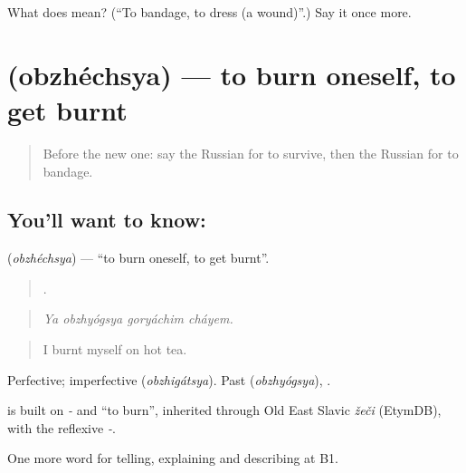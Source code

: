 \begin{tcolorbox}[breakable,colback=teal!4,colframe=teal!35!black,title={Before you move on}]
What does  mean? (\textquotedblleft{}To bandage, to dress (a wound)\textquotedblright{}.) Say it once more.
\end{tcolorbox}
\section[\texorpdfstring{\ru{обжечься} (obzhéchsya)}{обжечься (obzhéchsya)}]{ (obzhéchsya) — to burn oneself, to get burnt}

\label{lesson:RU-C302-obzhechsya}



\begin{quote}
Before the new one: say the Russian for to survive, then the Russian for to bandage.
\end{quote}

\subsection*{You'll want to know: }
\textbf{} (\emph{obzhéchsya}) — \textquotedblleft{}to burn oneself, to get burnt\textquotedblright{}.

\begin{quote}
   .
\end{quote}

\begin{quote}
\emph{Ya obzhyógsya goryáchim cháyem.}
\end{quote}

\begin{quote}
I burnt myself on hot tea.
\end{quote}

Perfective; imperfective \emph{} (\emph{obzhigátsya}). Past \emph{} (\emph{obzhyógsya}), \emph{}.

\begin{cousinweb}
\emph{} is built on \emph{-} and \emph{} \textquotedblleft{}to burn\textquotedblright{}, inherited through Old East Slavic \emph{žeči} (EtymDB), with the reflexive \emph{-}.
\end{cousinweb}

\begin{grammarlens}[title={What you've built}]
One more word for telling, explaining and describing at B1.
\end{grammarlens}


